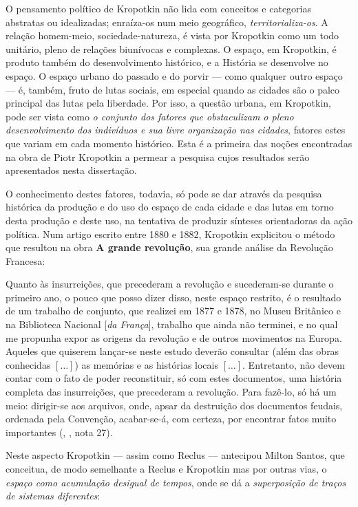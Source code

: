 O pensamento político de Kropotkin não lida com conceitos e categorias abstratas ou idealizadas; enraíza-os num meio geográfico, \textit{territorializa-os}. A relação homem-meio, sociedade-natureza, é vista por Kropotkin como um todo unitário, pleno de relações biunívocas e complexas. O espaço, em Kropotkin, é produto também do desenvolvimento histórico, e a História se desenvolve no espaço. O espaço urbano do passado e do porvir --- como qualquer outro espaço --- é, também, fruto de lutas sociais, em especial quando as cidades são o palco principal das lutas pela liberdade. Por isso, a questão urbana, em Kropotkin, pode ser vista como \textit{o conjunto dos fatores que obstaculizam o pleno desenvolvimento dos indivíduos e sua livre organização nas cidades}, fatores estes que variam em cada momento histórico. Esta é a primeira das noções encontradas na obra de Piotr Kropotkin a permear a pesquisa cujos resultados serão apresentados nesta dissertação.

O conhecimento destes fatores, todavia, só pode se dar através da pesquisa histórica da produção e do uso do espaço de cada cidade e das lutas em torno desta produção e deste uso, na tentativa de produzir sínteses orientadoras da ação política. Num artigo escrito entre 1880 e 1882, Kropotkin explicitou o método que resultou na obra \textbf{A grande revolução}, sua grande análise da Revolução Francesa: 

\begin{citacao}
Quanto às insurreições, que precederam a revolução e sucederam-se durante o primeiro ano, o pouco que posso dizer disso, neste espaço restrito, é o resultado de um trabalho de conjunto, que realizei em 1877 e 1878, no Museu Britânico e na Biblioteca Nacional [\textit{da França}], trabalho que ainda não terminei, e no qual me propunha expor as origens da revolução e de outros movimentos na Europa. Aqueles que quiserem lançar-se neste estudo deverão consultar (além das obras conhecidas \([\dots]\)) as memórias e as histórias locais \([\dots]\). Entretanto, não devem contar com o fato de poder reconstituir, só com estes documentos, uma história completa das insurreições, que precederam a revolução. Para fazê-lo, só há um meio: dirigir-se aos arquivos, onde, apsar da destruição dos documentos feudais, ordenada pela Convenção, acabar-se-á, com certeza, por encontrar fatos muito importantes (\citeauthor{KROPOTKIN2005f}, \citeyear{KROPOTKIN2005f},  nota 27).
\end{citacao}

Neste aspecto Kropotkin --- assim como Reclus --- antecipou Milton Santos, que conceitua, de modo semelhante a Reclus e Kropotkin mas por outras vias, o \textit{espaço como acumulação desigual de tempos}, onde se dá a \textit{superposição de traços de sistemas diferentes}:

